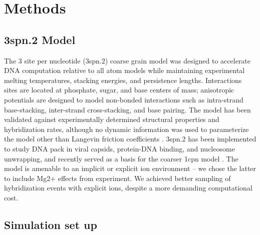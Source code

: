 \documentclass[journal=jpcbfk,manuscript=article]{achemso}
\begin{document}
\section{\label{sec:methods}Methods}

\subsection{\label{sec:methods}3spn.2 Model}

The 3 site per nucleotide (3spn.2) coarse grain model was designed to accelerate DNA computation relative to all atom models while maintaining experimental melting temperatures, stacking energies, and persistence lengths\citep{Hinckley2013AnHybridization}. Interactions sites are located at phosphate, sugar, and base centers of mass; anisotropic potentials are designed to model non-bonded interactions such as intra-strand base-stacking, inter-strand cross-stacking, and base pairing. The model has been validated against experimentally determined structural properties and hybridization rates, although no dynamic information was used to parameterize the model other than Langevin friction coefficients \citep{Hinckley2013AnHybridization, Hinckley2014Coarse-grainedEffects}. 3spn.2 has been implemented to study DNA pack in viral capsids, protein-DNA binding, and nucleosome unwrapping, and recently served as a basis for the coarser 1cpn model \citep{Cordoba2017AIons, Lu2020OpenAWSEMSummary, Lequieu2016Tension-dependentUnwrapping, Lequieu20191CPN:Chromatin}. The model is amenable to an implicit or explicit ion environment -- we chose the latter to include Mg2+ effects from experiment. We achieved better sampling of hybridization events with explicit ions, despite a more demanding computational cost.


\subsection{\label{sec:methods}Simulation set up}
\end{document}
